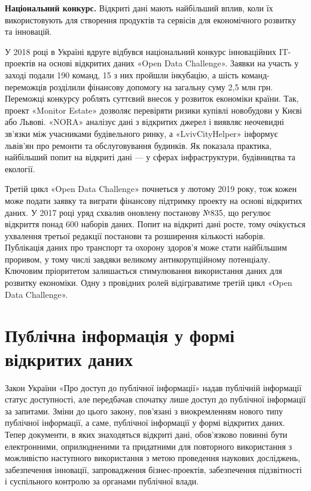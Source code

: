 \textbf{Національний конкурс.}
Відкриті дані мають найбільший вплив, коли їх використовують для створення продуктів та сервісів для економічного розвитку та інновацій.

У 2018 році в Україні вдруге відбувся національний конкурс інноваційних IT-проектів на основі відкритих даних «Open Data Challenge».
Заявки на участь у заході подали 190 команд, 15 з них пройшли інкубацію, а шість команд-переможців розділили фінансову допомогу на загальну суму 2,5 млн грн.
Переможці конкурсу роблять суттєвий внесок у розвиток економіки країни.
Так, проект «Monitor Estate» дозволяє перевіряти ризики купівлі новобудови у Києві або Львові.
«NORA» аналізує дані з відкритих джерел і виявляє неочевидні зв'язки між учасниками будівельного ринку, а «LvivCityHelper» інформує львів'ян про ремонти та обслуговування будинків.
Як показала практика, найбільший попит на відкриті дані — у сферах інфраструктури, будівництва та екології.

Третій цикл «Open Data Challenge»  почнеться у лютому 2019 року,
тож кожен може подати заявку та виграти фінансову підтримку проекту на основі відкритих даних.
У 2017 році уряд схвалив оновлену постанову №835, що регулює відкриття понад 600 наборів даних.
Попит на відкриті дані росте, тому очікується ухвалення третьої редакції постанови та розширення кількості наборів.
Публікація даних про транспорт та охорону здоров'я може стати найбільшим проривом,
у тому числі завдяки великому антикорупційному потенціалу.
Ключовим пріоритетом залишається стимулювання використання даних для розвитку економіки.
Одну з провідних ролей відіграватиме третій цикл «Open Data Challenge».

\section{Публічна інформація у формі відкритих даних}

Закон України «Про доступ до публічної інформації» надав
публічній інформації статус доступності, але передбачав спочатку
лише доступ до публічної інформації за запитами. Зміни до цього
закону, пов’язані з виокремленням нового типу публічної інформації,
а саме, публічної інформації у формі відкритих даних.
Тепер документи, в яких знаходяться відкриті дані, обов’язково
повинні бути електронними, оприлюдненими та
придатними для повторного використання з можливістю наступного
використання з метою проведення наукових досліджень, забезпечення
інновації, запровадження бізнес-проектів, забезпечення підзвітності і
суспільного контролю за органами публічної влади.

